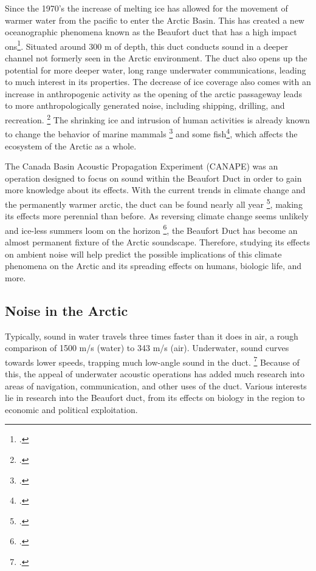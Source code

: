 Since the 1970's the increase of melting ice has allowed for the movement of warmer water from the pacific to enter the Arctic Basin. This has created a new oceanographic phenomena known as the Beaufort duct that has a high impact ons\footcite[]{toole2010influences}. Situated around 300 m of depth, this duct conducts sound in a deeper channel not formerly seen in the Arctic environment. The duct also opens up the potential for more deeper water, long range underwater communications, leading to much interest in its properties. The decrease of ice coverage also comes with an increase in anthropogenic activity as the opening of the arctic passageway leads to more anthropologically generated noise, including shipping, drilling, and recreation. \footcite[]{judson2010trends} The shrinking ice and intrusion of human activities is already known to change the behavior of marine mammals \footcite[]{} and some fish\footcite[]{ivanova2020shipping}, which affects the ecosystem of the Arctic as a whole.

The Canada Basin Acoustic Propagation Experiment (CANAPE) was an operation designed to focus on sound within the Beaufort Duct in order to gain more knowledge about its effects. With the current trends in climate change and the permanently warmer arctic, the duct can be found nearly all year \footcite[]{duda2017acoustic}, making its effects more perennial than before. As reversing climate change seems unlikely and ice-less summers loom on the horizon \footcite[]{notz2020}, the Beaufort Duct has become an almost permanent fixture of the Arctic soundscape. Therefore, studying its effects on ambient noise will help predict the possible implications of this climate phenomena on the Arctic and its spreading effects on humans, biologic life, and more.


\subsection{Noise in the Arctic}    \label{intro_arctic_noise}

Typically, sound in water travels three times faster than it does in air, a rough comparison of 1500 m/s (water) to 343 m/s (air). Underwater, sound curves towards lower speeds, trapping much low-angle sound in the duct. \footcite[]{chen2020tempo}  Because of this, the appeal of underwater acoustic operations has added much research into areas of navigation, communication, and other uses of the duct. Various interests lie in research into the Beaufort duct, from its effects on biology in the region to economic and political exploitation. 

